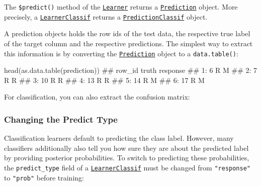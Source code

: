 \documentclass[]{article}
\newenvironment{Shaded}{}{}
\newcommand{\KeywordTok}[1]{\textcolor[rgb]{0.00,0.00,1.00}{#1}}
\newcommand{\NormalTok}[1]{#1}
\newcommand{\OperatorTok}[1]{#1}
\renewenvironment{Shaded} {\begin{snugshade}\small} {\end{snugshade}}
\begin{document}
The \texttt{\$predict()} method of the \href{https://mlr3.mlr-org.com/reference/Learner.html}{\texttt{Learner}} returns a \href{https://mlr3.mlr-org.com/reference/Prediction.html}{\texttt{Prediction}} object.
More precisely, a \href{https://mlr3.mlr-org.com/reference/LearnerClassif.html}{\texttt{LearnerClassif}} returns a \href{https://mlr3.mlr-org.com/reference/PredictionClassif.html}{\texttt{PredictionClassif}} object.

A prediction objects holds the row ids of the test data, the respective true label of the target column and the respective predictions.
The simplest way to extract this information is by converting the \href{https://mlr3.mlr-org.com/reference/Prediction.html}{\texttt{Prediction}} object to a \texttt{data.table()}:

\begin{Shaded}
\begin{Highlighting}[]
\KeywordTok{head}\NormalTok{(}\KeywordTok{as.data.table}\NormalTok{(prediction))}
\NormalTok{##    row_id truth response}
\NormalTok{## 1:      6     R        M}
\NormalTok{## 2:      7     R        R}
\NormalTok{## 3:     10     R        R}
\NormalTok{## 4:     13     R        R}
\NormalTok{## 5:     14     R        M}
\NormalTok{## 6:     17     R        M}
\end{Highlighting}
\end{Shaded}

For classification, you can also extract the confusion matrix:

\begin{Shaded}
\end{Shaded}

\hypertarget{predict-type}{%
\subsubsection{Changing the Predict Type}\label{predict-type}}

Classification learners default to predicting the class label.
However, many classifiers additionally also tell you how sure they are about the predicted label by providing posterior probabilities.
To switch to predicting these probabilities, the \texttt{predict\_type} field of a \href{https://mlr3.mlr-org.com/reference/LearnerClassif.html}{\texttt{LearnerClassif}} must be changed from \texttt{"response"} to \texttt{"prob"} before training:
\end{document}
